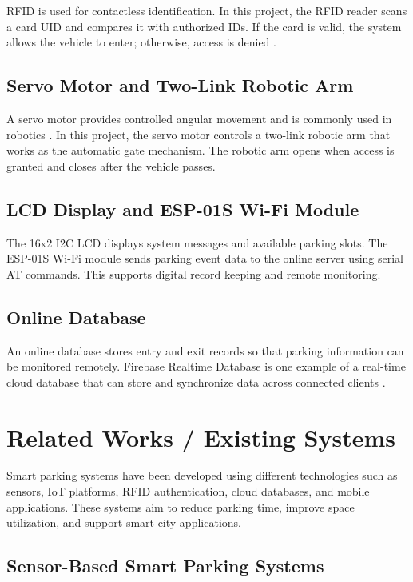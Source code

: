 RFID is used for contactless identification. In this project, the RFID reader scans a card UID and compares it with authorized IDs. If the card is valid, the system allows the vehicle to enter; otherwise, access is denied \cite{b11}.

\subsection{Servo Motor and Two-Link Robotic Arm}

A servo motor provides controlled angular movement and is commonly used in robotics \cite{b10}. In this project, the servo motor controls a two-link robotic arm that works as the automatic gate mechanism. The robotic arm opens when access is granted and closes after the vehicle passes.

\subsection{LCD Display and ESP-01S Wi-Fi Module}

The 16x2 I2C LCD displays system messages and available parking slots. The ESP-01S Wi-Fi module sends parking event data to the online server using serial AT commands. This supports digital record keeping and remote monitoring.

\subsection{Online Database}

An online database stores entry and exit records so that parking information can be monitored remotely. Firebase Realtime Database is one example of a real-time cloud database that can store and synchronize data across connected clients \cite{b8}.

\section{Related Works / Existing Systems}

Smart parking systems have been developed using different technologies such as sensors, IoT platforms, RFID authentication, cloud databases, and mobile applications. These systems aim to reduce parking time, improve space utilization, and support smart city applications.

\subsection{Sensor-Based Smart Parking Systems}

